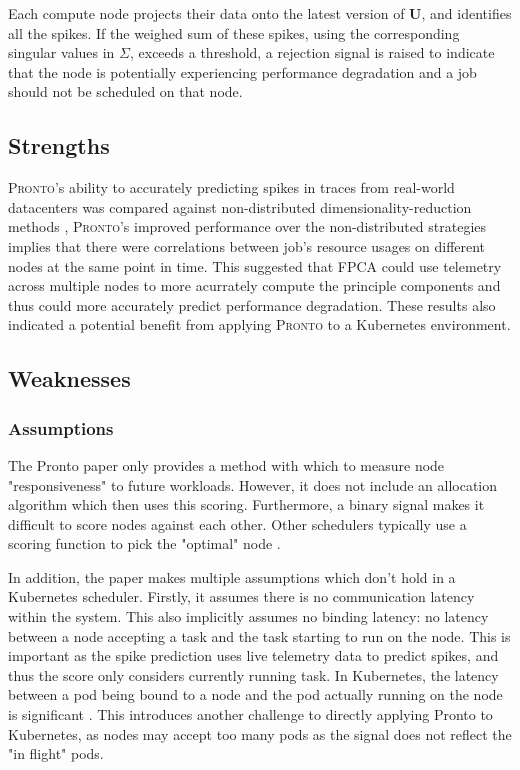 Each compute node projects their data onto the latest version of $\textbf{U}$,
and identifies all the spikes. If the weighed sum of these spikes, using the
corresponding singular values in $\Sigma$, exceeds a threshold, a rejection
signal is raised to indicate that the node is potentially experiencing
performance degradation and a job should not be scheduled on that node.

\subsection{Strengths}
\textsc{Pronto}'s ability to accurately predicting spikes in traces from real-world
datacenters was compared against non-distributed dimensionality-reduction
methods \cite{}, \textsc{Pronto}'s improved performance over the non-distributed
strategies implies that there were correlations between job's resource usages on
different nodes at the same point in time. This suggested that FPCA could use
telemetry across multiple nodes to more acurrately compute the principle
components and thus could more accurately predict performance degradation.
These results also indicated a potential benefit from applying \textsc{Pronto} to a
Kubernetes environment.

\subsection{Weaknesses}
\subsubsection{Assumptions}
The Pronto paper only provides a method with which to measure node
"responsiveness" to future workloads. However, it does not include an allocation
algorithm which then uses this scoring. Furthermore, a binary signal makes it
difficult to score nodes against each other. Other schedulers typically use a
scoring function to pick the "optimal" node \cite{kube-scheduler}\cite{}.

In addition, the paper makes multiple assumptions which don't hold in a Kubernetes
scheduler. Firstly, it assumes there is no communication latency within the system.
This also implicitly assumes no binding latency: no latency between a node
accepting a task and the task starting to run on the node. This is important as
the spike prediction uses live telemetry data to predict spikes, and thus the
score only considers currently running task. In Kubernetes, the latency between
a pod being bound to a node and the pod actually running on the node is
significant \cite{tyczynski_kubernetes_2015}. This introduces another challenge to directly applying
Pronto to Kubernetes, as nodes may accept too many pods as the signal does not
reflect the "in flight" pods.


